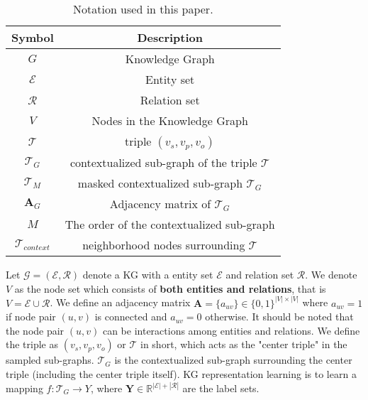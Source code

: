 \documentclass[sigconf]{acmart}
\begin{document}
\begin{table}[!t]
    \caption{Notation used in this paper.}
        
    \centering
\begin{tabular}{cc}
            \toprule
            \textbf{Symbol}  & \textbf{Description}\\
            \midrule
            $G$ & Knowledge Graph
            \\    
            $\mathcal{E}$  & Entity set
            \\  
            $\mathcal{R}$  & Relation set
            \\  
            $V$  & Nodes in the Knowledge Graph
            \\  
            $\mathcal{T}$  & triple $(v_s, v_p, v_o)$
            \\  
            $\mathcal{T}_G$ & contextualized sub-graph of the triple $\mathcal{T}$
            \\
            $\mathcal{T}_{M}$ & masked contextualized sub-graph $\mathcal{T}_G$
            \\ 
            $\mathbf{A}_G$  & Adjacency matrix of $\mathcal{T}_G$
            \\
            $M$  & The order of the contextualized sub-graph
            \\
            $\mathcal{T}_{context}$ & neighborhood nodes surrounding $\mathcal{T}$
            \\
            \bottomrule
        \end{tabular}
\label{table:Definition_Notation}
\end{table}%
Let $\mathcal{G} = (\mathcal{E}, \mathcal{R})$ denote a KG with a entity set $\mathcal{E}$ and relation set $\mathcal{R}$.
We denote $V$ as the node set which consists of \textbf{both entities and relations}, that is $V = \mathcal{E} \cup \mathcal{R}$.
We define an adjacency matrix $\mathbf{A} = \{ a_{uv}\} \in \{ 0, 1 \}^{\left | V  \right |  \times \left | V \right | } $ where $a_{uv}=1$ if node pair $(u,v)$ is connected and $a_{uv}=0$ otherwise. 
It should be noted that the node pair $(u,v)$ can be interactions among entities and relations.
We define the triple as  $(v_{{s}}, v_{p}, v_{o} )$ or $\mathcal{T}$ in short, which acts as the "center triple" in the sampled sub-graphs.
$\mathcal{T}_G$ is the contextualized sub-graph surrounding the center triple (including the center triple itself).
KG representation learning is to learn a mapping $f:\mathcal{T}_G \to Y$, where  $\mathbf{Y} \in \mathbb{R}^{ \left |  \mathcal{E}  \right | + \left |  \mathcal{R}  \right | }$ are the label sets.
\end{document}
